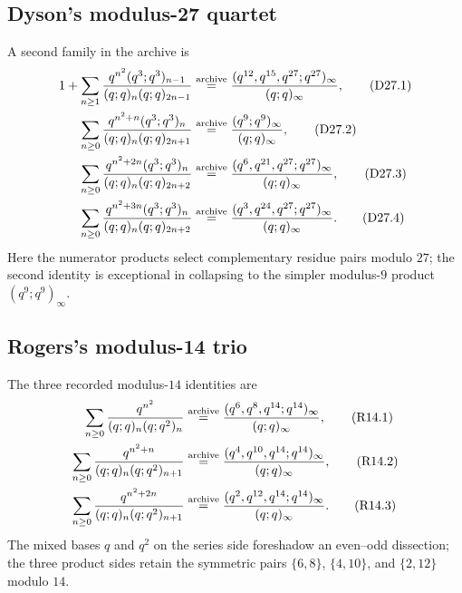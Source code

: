 \documentclass[11pt,oneside]{article}
\theoremstyle{definition}
\begin{document}
\subsection{Dyson's modulus-27 quartet}

A second family in the archive is
\begin{align*}
 1+\sum_{n\ge1}
 \frac{q^{n^2}(q^3;q^3)_{n-1}}
 {(q;q)_n(q;q)_{2n-1}}
 &\mathrel{\stackrel{\rm archive}{=}}
 \frac{(q^{12},q^{15},q^{27};q^{27})_\infty}
 {(q;q)_\infty},
 \tag{D27.1}\label{eq:atlas-d27-1}\\
 \sum_{n\ge0}
 \frac{q^{n^2+n}(q^3;q^3)_n}
 {(q;q)_n(q;q)_{2n+1}}
 &\mathrel{\stackrel{\rm archive}{=}}
 \frac{(q^9;q^9)_\infty}{(q;q)_\infty},
 \tag{D27.2}\label{eq:atlas-d27-2}\\
 \sum_{n\ge0}
 \frac{q^{n^2+2n}(q^3;q^3)_n}
 {(q;q)_n(q;q)_{2n+2}}
 &\mathrel{\stackrel{\rm archive}{=}}
 \frac{(q^6,q^{21},q^{27};q^{27})_\infty}
 {(q;q)_\infty},
 \tag{D27.3}\label{eq:atlas-d27-3}\\
 \sum_{n\ge0}
 \frac{q^{n^2+3n}(q^3;q^3)_n}
 {(q;q)_n(q;q)_{2n+2}}
 &\mathrel{\stackrel{\rm archive}{=}}
 \frac{(q^3,q^{24},q^{27};q^{27})_\infty}
 {(q;q)_\infty}.
 \tag{D27.4}\label{eq:atlas-d27-4}
\end{align*}
Here the numerator products select complementary residue pairs modulo $27$;
the second identity is exceptional in collapsing to the simpler modulus-$9$
product $(q^9;q^9)_\infty$.

\subsection{Rogers's modulus-14 trio}

The three recorded modulus-$14$ identities are
\begin{align*}
 \sum_{n\ge0}\frac{q^{n^2}}
 {(q;q)_n(q;q^2)_n}
 &\mathrel{\stackrel{\rm archive}{=}}
 \frac{(q^6,q^8,q^{14};q^{14})_\infty}{(q;q)_\infty},
 \tag{R14.1}\label{eq:atlas-r14-1}\\
 \sum_{n\ge0}\frac{q^{n^2+n}}
 {(q;q)_n(q;q^2)_{n+1}}
 &\mathrel{\stackrel{\rm archive}{=}}
 \frac{(q^4,q^{10},q^{14};q^{14})_\infty}{(q;q)_\infty},
 \tag{R14.2}\label{eq:atlas-r14-2}\\
 \sum_{n\ge0}\frac{q^{n^2+2n}}
 {(q;q)_n(q;q^2)_{n+1}}
 &\mathrel{\stackrel{\rm archive}{=}}
 \frac{(q^2,q^{12},q^{14};q^{14})_\infty}{(q;q)_\infty}.
 \tag{R14.3}\label{eq:atlas-r14-3}
\end{align*}
The mixed bases $q$ and $q^2$ on the series side foreshadow an even--odd
dissection; the three product sides retain the symmetric pairs
$\{6,8\}$, $\{4,10\}$, and $\{2,12\}$ modulo $14$.
\end{document}

